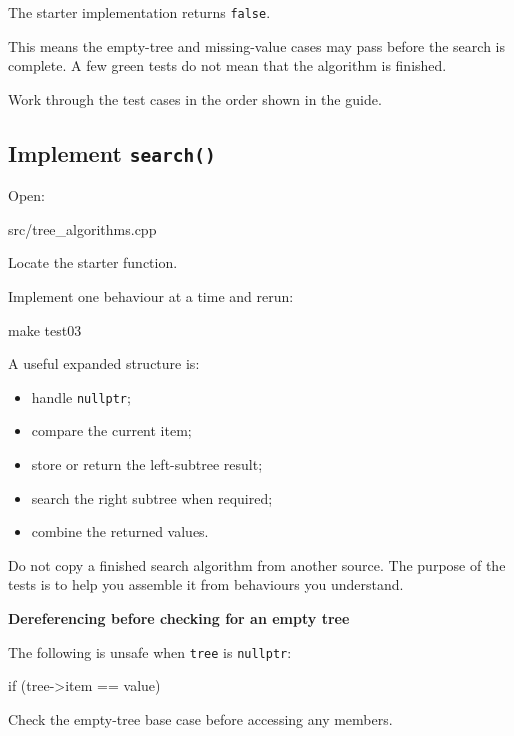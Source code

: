 \documentclass{csc2059practical}
\begin{document}
\begin{importantnote}
The starter implementation returns \texttt{false}.

This means the empty-tree and missing-value cases may pass before the search is
complete. A few green tests do not mean that the algorithm is finished.

Work through the test cases in the order shown in the guide.
\end{importantnote}

\subsection{Implement \texttt{search()}}

Open:

\begin{terminal}
src/tree_algorithms.cpp
\end{terminal}

Locate the starter function.

Implement one behaviour at a time and rerun:

\begin{terminal}
make test03
\end{terminal}

A useful expanded structure is:

\begin{itemize}
    \item handle \texttt{nullptr};
    \item compare the current item;
    \item store or return the left-subtree result;
    \item search the right subtree when required;
    \item combine the returned values.
\end{itemize}

Do not copy a finished search algorithm from another source. The purpose of
the tests is to help you assemble it from behaviours you understand.

\begin{commonerror}
\textbf{Dereferencing before checking for an empty tree}

The following is unsafe when \texttt{tree} is
\texttt{nullptr}:

\begin{cppcode}
if (tree->item == value)
\end{cppcode}

Check the empty-tree base case before accessing any members.
\end{commonerror}
\end{document}

